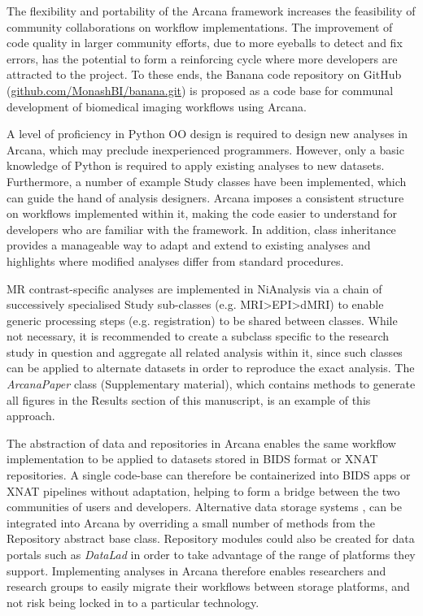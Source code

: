 \documentclass[smallextended]{svjour3}       %
\begin{document}
The flexibility and portability of the Arcana framework increases the
feasibility of community collaborations on workflow implementations. The
improvement of code quality in larger community efforts, due to more
eyeballs to detect and fix errors, has the potential to form a
reinforcing cycle where more developers are attracted to the project.
To these ends, the Banana code repository on GitHub
(\url{github.com/MonashBI/banana.git}) is proposed as a code base
for communal development of biomedical imaging workflows using Arcana.

A level of proficiency in Python OO design is required to design new
analyses in Arcana, which may preclude inexperienced programmers.
However, only a basic knowledge of Python is required to apply existing
analyses to new datasets. Furthermore, a number of example Study classes
have been implemented, which can guide the hand of analysis designers.
Arcana imposes a consistent structure on workflows implemented within
it, making the code easier to understand for developers who are familiar
with the framework. In addition, class inheritance provides a manageable
way to adapt and extend to existing analyses and highlights where
modified analyses differ from standard procedures.

MR contrast-specific analyses are implemented in NiAnalysis via a chain
of successively specialised Study sub-classes (e.g.
MRI\textgreater{}EPI\textgreater{}dMRI) to enable generic processing
steps (e.g. registration) to be shared between classes. While not
necessary, it is recommended to create a subclass specific to the
research study in question and aggregate all related analysis within it,
since such classes can be applied to alternate datasets in order to
reproduce the exact analysis. The \emph{ArcanaPaper} class
(Supplementary material), which contains methods to generate all figures
in the Results section of this manuscript, is an example of this approach.

The abstraction of data and repositories in Arcana enables the same
workflow implementation to be applied to datasets stored in BIDS format
or XNAT repositories. A single code-base can therefore be containerized
into BIDS apps or XNAT pipelines without adaptation, helping to form a
bridge between the two communities of users and developers. Alternative
data storage systems \citep{scott_coins:_2011,das_loris:_2012,book_neuroinformatics_2013},
can be integrated into Arcana by overriding a small number of
methods from the Repository abstract base class. Repository modules
could also be created for data portals such as \emph{DataLad}
\citep{yaroslav_halchenko_datalad/datalad_2018}
in order to take advantage of the range of platforms they support.
Implementing analyses in Arcana therefore enables researchers and
research groups to easily migrate their workflows between storage
platforms, and not risk being locked in to a particular technology.
\end{document}
